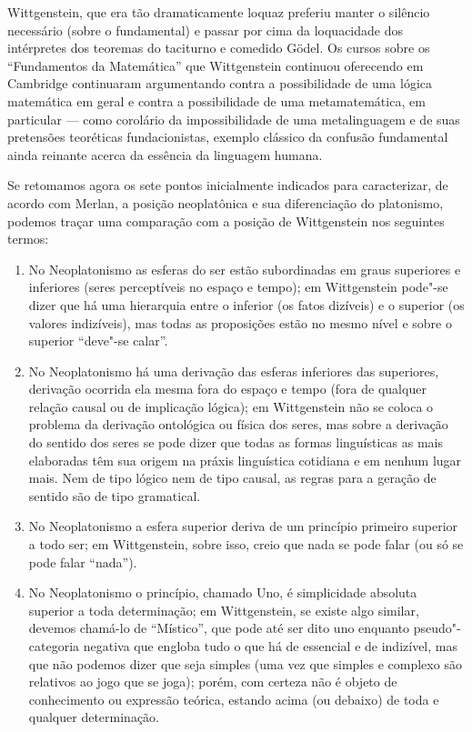 {Wittgenstein, que era tão dramaticamente loquaz preferiu
manter o silêncio necessário (sobre o fundamental) e passar por
cima da loquacidade dos intérpretes dos teoremas do taciturno e
comedido Gödel. Os cursos sobre os “Fundamentos da Matemática”
que Wittgenstein continuou oferecendo em Cambridge continuaram
argumentando contra a possibilidade de uma lógica matemática em
geral e contra a possibilidade de uma metamatemática, em
particular --- como corolário da impossibilidade de uma
metalinguagem e de suas pretensões teoréticas fundacionistas,
exemplo clássico da confusão fundamental ainda reinante acerca
da essência da linguagem humana.

Se retomamos agora os sete pontos inicialmente indicados para
caracterizar, de acordo com Merlan, a posição neoplatônica e sua
diferenciação do platonismo, podemos traçar uma comparação com a
posição de Wittgenstein nos seguintes termos:

\begin{enumerate}
\item No Neoplatonismo as esferas do ser estão subordinadas em
graus superiores e inferiores (seres perceptíveis no espaço e
tempo); em Wittgenstein pode"-se dizer que há uma hierarquia
entre o inferior (os fatos dizíveis) e o superior (os valores
indizíveis), mas todas as proposições estão no mesmo nível e
sobre o superior “deve"-se calar”. 

\item No Neoplatonismo há uma derivação das esferas inferiores
das superiores, derivação ocorrida ela mesma fora do espaço e
tempo (fora de qualquer relação causal ou de implicação lógica);
 em Wittgenstein não se coloca o problema da derivação
ontológica ou física dos seres, mas sobre a derivação do sentido
dos seres se pode dizer que todas as formas linguísticas as mais
elaboradas têm sua origem na práxis linguística cotidiana e em
nenhum lugar mais. Nem de tipo lógico nem de tipo causal, as
regras para a geração de sentido são de tipo gramatical.

\item No Neoplatonismo a esfera superior deriva de um princípio
primeiro superior a todo ser; em Wittgenstein, sobre isso, creio
que nada se pode falar (ou só se pode falar ``nada'').

\item No Neoplatonismo o princípio, chamado Uno, é simplicidade
absoluta superior a toda determinação;  em Wittgenstein, se
existe algo similar, devemos chamá-lo de
``Místico'', que pode até ser
dito uno enquanto pseudo"-categoria negativa que engloba tudo o
que há de essencial e de indizível, mas que não podemos dizer
que seja simples (uma vez que simples e complexo são relativos
ao jogo que se joga); porém, com certeza não é objeto de
conhecimento ou expressão teórica, estando acima (ou debaixo) de
toda e qualquer determinação.


\end{enumerate}}
